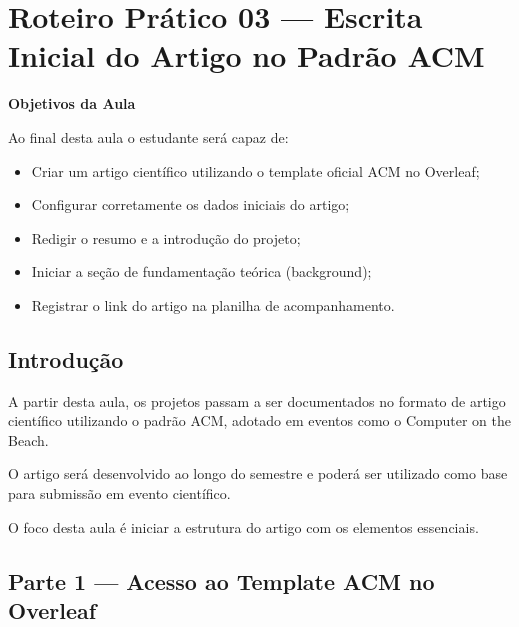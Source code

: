 
\section{Roteiro Prático 03 — Escrita Inicial do Artigo no Padrão ACM}


\begin{boxObjetivos}
\textbf{Objetivos da Aula}

Ao final desta aula o estudante será capaz de:

\begin{itemize}
\item Criar um artigo científico utilizando o template oficial ACM no Overleaf;
\item Configurar corretamente os dados iniciais do artigo;
\item Redigir o resumo e a introdução do projeto;
\item Iniciar a seção de fundamentação teórica (background);
\item Registrar o link do artigo na planilha de acompanhamento.
\end{itemize}
\end{boxObjetivos}


\subsection{Introdução}

A partir desta aula, os projetos passam a ser documentados no formato de artigo científico utilizando o padrão ACM, adotado em eventos como o Computer on the Beach.

O artigo será desenvolvido ao longo do semestre e poderá ser utilizado como base para submissão em evento científico.

O foco desta aula é iniciar a estrutura do artigo com os elementos essenciais.


\subsection{Parte 1 — Acesso ao Template ACM no Overleaf}

